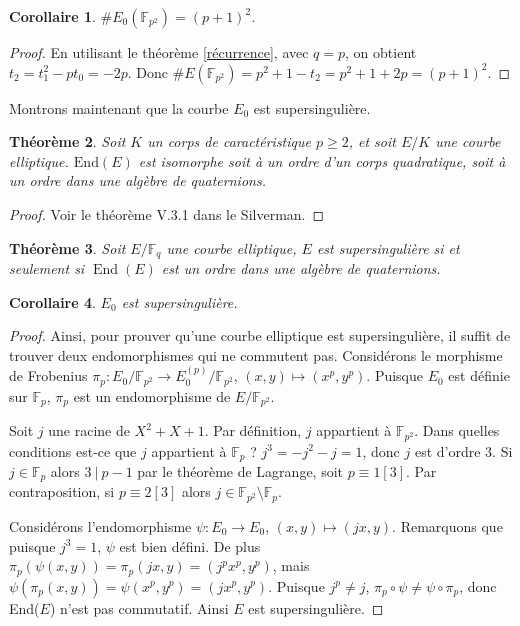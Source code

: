 \documentclass{article}
\theoremstyle{plain}%
\newtheorem{thm}{Théorème}[section]
\newtheorem{cor}[thm]{Corollaire}
\theoremstyle{definition}%
\newcommand{\F}{\mathbb{F}}
\DeclareMathOperator{\End}{End}
\begin{document}
\begin{cor}
$\#E_0(\F_{p^2}) = (p+1)^2$.
\end{cor}

\begin{proof}
  En utilisant le théorème \ref{récurrence}, avec $q = p$, on obtient $t_2 = t_1^2 - pt_0 = -2p$. Donc $\#E(\F_{p^2}) = p^2 + 1 - t_2 = p^2 + 1 + 2p = (p+1)^2$.
\end{proof}


Montrons maintenant que la courbe $E_0$ est supersingulière.

\begin{thm}
  Soit $K$ un corps de caractéristique $p\ge 2$, et soit $E/K$ une courbe elliptique. $\mathrm{End}(E)$ est isomorphe soit à un ordre d'un corps quadratique, soit à un ordre dans une algèbre de quaternions. 
\end{thm}

\begin{proof}
  Voir le théorème V.3.1 dans le Silverman.
\end{proof}

\begin{thm}
  Soit $E/\F_q$ une courbe elliptique, $E$ est supersingulière si et seulement si $\End(E)$ est un ordre dans une algèbre de quaternions.
\end{thm}

\begin{cor}
  $E_0$ est supersingulière.
\end{cor}

\begin{proof}
Ainsi, pour prouver qu'une courbe elliptique est supersingulière, il suffit de trouver deux endomorphismes qui ne commutent pas.
Considérons le morphisme de Frobenius $\pi_p : E_0/\F_{p^2} \to E_0^{(p)}/\F_{p^2}$, $(x, y) \mapsto (x^p, y^p)$. 
Puisque $E_0$ est définie sur $\F_{p}$, $\pi_p$ est un endomorphisme de $E/\F_{p^2}$.

Soit $j$ une racine de $X^2 + X + 1$. 
Par définition, $j$ appartient à $\F_{p^2}$. 
Dans quelles conditions est-ce que $j$ appartient à $\F_{p}$ ? 
$j^3 = -j^2 -j = 1$, donc $j$ est d'ordre $3$. 
Si $j\in \F_{p}$ alors $3\ |\ p-1$ par le théorème de Lagrange, soit $p\equiv 1[3]$. 
Par contraposition, si $p \equiv 2 [3]$ alors $j\in\F_{p^2}\setminus\F_{p}$.

Considérons l'endomorphisme $\psi : E_0 \to E_0$, $(x, y) \mapsto (jx, y)$. 
Remarquons que puisque $j^3 = 1$, $\psi$ est bien défini.
De plus $\pi_p(\psi(x, y)) = \pi_p(jx, y) = (j^px^p, y^p)$, mais $\psi(\pi_p(x, y)) = \psi(x^p, y^p) = (jx^p, y^p)$. 
Puisque $j^p\neq j$, $\pi_p \circ \psi \neq \psi \circ \pi_p$, donc End($E$) n'est pas commutatif.
Ainsi $E$ est supersingulière.
\end{proof}
\end{document}
